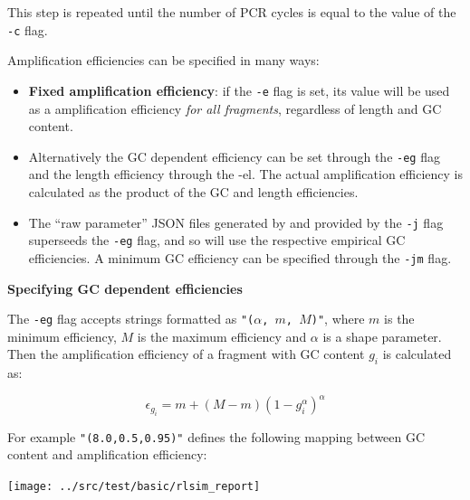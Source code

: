 This step is repeated until the number of PCR cycles is equal to the value of the \texttt{-c} flag.

Amplification efficiencies can be specified in many ways:

\begin{itemize}
    \item{\textbf{Fixed amplification efficiency}: if the \texttt{-e} flag is set, its value will be used as a amplification efficiency \emph{for all fragments}, regardless of length and GC content.}
    \item{Alternatively the GC dependent efficiency can be set through the \texttt{-eg} flag and the length efficiency through the {-el}. The actual amplification efficiency is calculated as the product of the GC and length efficiencies.}
    \item{The ``raw parameter'' JSON files generated by \effest and provided by the \texttt{-j} flag superseeds the \texttt{-eg} flag, and so \rlsim will use the respective empirical GC efficiencies. A minimum GC efficiency can be specified through the \texttt{-jm} flag.}
\end{itemize}

\vspace{1em}\textbf{Specifying GC dependent efficiencies}\vspace{1em}

The \texttt{-eg} flag accepts strings formatted as \texttt{"(${\alpha}$, $m$, $M$)"}, where $m$ is the minimum efficiency, $M$ is the maximum efficiency and $\alpha$ is a shape parameter. Then the amplification efficiency of a fragment with GC content $g_i$ is calculated as:

\begin{equation}\label{eq:gc_eff}
    \epsilon_{g_i} = m + (M-m) \left(1 - g_i^\alpha\right)^\alpha
\end{equation}

For example \texttt{"(8.0,0.5,0.95)"} defines the following mapping between GC content and amplification efficiency:

\begin{center}
    \texttt{[image: ../src/test/basic/rlsim\_report]}
\end{center}


